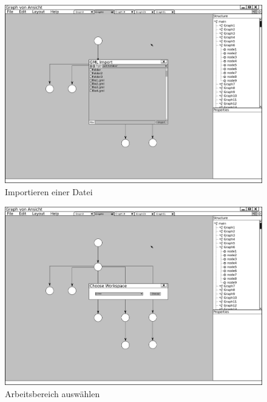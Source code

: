 \begin{figure}[ht]
  \centering
  \includegraphics[width=380pt]{resourcen/gui_window_import.png}
  \caption{Importieren einer Datei}
  \label{fig:gui_window_import}
\end{figure}

\begin{figure}[ht]
  \centering
  \includegraphics[width=380pt]{resourcen/gui_window_chooseWorkspace.png}
  \caption{Arbeitsbereich auswählen}
  \label{fig:gui_window_chooseWorkspace}
\end{figure}

